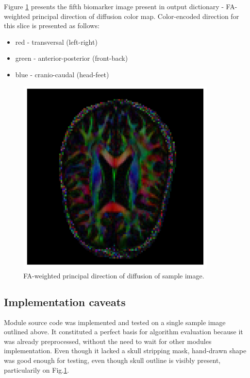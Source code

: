 Figure \ref{fig:m6_pic_5} presents the fifth biomarker image present in output dictionary - FA-weighted principal direction of diffusion color map. Color-encoded direction for this slice is presented as follows:
\begin{itemize}
	\item 
	red - transversal (left-right)
	
	\item 
	green - anterior-posterior (front-back)
	
	\item
	blue - cranio-caudal (head-feet)
\end{itemize}

\begin{figure}[H]
	\includegraphics[width=10cm]{figures/Module_06/fa_rgb}
	\centering
	\caption{FA-weighted principal direction of diffusion of sample image.}
	\label{fig:m6_pic_5}
\end{figure}

\subsection{Implementation caveats}

Module source code was implemented and tested on a single sample image outlined above. It constituted a perfect basis for algorithm evaluation because it was already preprocessed, without the need to wait for other modules implementation. Even though it lacked a skull stripping mask, hand-drawn shape was good enough for testing, even though skull outline is visibly present, particularily on Fig.\ref{fig:m6_pic_5}. 

